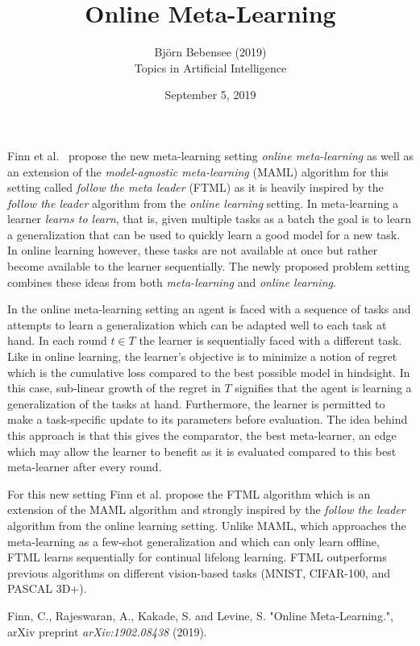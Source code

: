 \documentclass[12pt]{article}
\begin{document}
 
 
\title{Online Meta-Learning}
\author{Bj\"orn Bebensee (2019)\\ %
Topics in Artificial Intelligence}
\date{September 5, 2019}
\maketitle

Finn et al.~\cite{finn} propose the new meta-learning setting \emph{online meta-learning} as well as an extension of the \emph{model-agnostic meta-learning} (MAML) algorithm for this setting called \emph{follow the meta leader} (FTML) as it is heavily inspired by the \emph{follow the leader} algorithm from the \emph{online learning} setting. In meta-learning a learner \emph{learns to learn}, that is, given multiple tasks as a batch the goal is to learn a generalization that can be used to quickly learn a good model for a new task. In online learning however, these tasks are not available at once but rather become available to the learner sequentially. The newly proposed problem setting combines these ideas from both \emph{meta-learning} and \emph{online learning}.

In the online meta-learning setting an agent is faced with a sequence of tasks and attempts to learn a generalization which can be adapted well to each task at hand. In each round $t \in T$ the learner is sequentially faced with a different task. Like in online learning, the learner's objective is to minimize a notion of regret which is the cumulative loss compared to the best possible model in hindsight. In this case, sub-linear growth of the regret in $T$ signifies that the agent is learning a generalization of the tasks at hand. Furthermore, the learner is permitted to make a task-specific update to its parameters before evaluation. The idea behind this approach is that this gives the comparator, the best meta-learner, an edge which may allow the learner to benefit as it is evaluated compared to this best meta-learner after every round.
 
For this new setting Finn et al. propose the FTML algorithm which is an extension of the MAML algorithm and strongly inspired by the \emph{follow the leader} algorithm from the online learning setting. Unlike MAML, which approaches the meta-learning as a few-shot generalization and which can only learn offline, FTML learns sequentially for continual lifelong learning. FTML outperforms previous algorithms on different vision-based tasks (MNIST, CIFAR-100, and PASCAL 3D+).



\begin{thebibliography}{9}
Finn, C., Rajeswaran, A., Kakade, S. and Levine, S. "Online Meta-Learning.", arXiv preprint \textit{arXiv:1902.08438} (2019).

\end{thebibliography}
 
\end{document}
